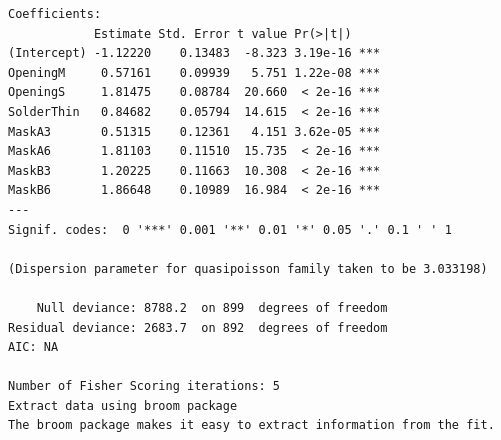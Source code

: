 \documentclass[
]{book}
\begin{document}
\begin{verbatim}
Coefficients:
            Estimate Std. Error t value Pr(>|t|)    
(Intercept) -1.12220    0.13483  -8.323 3.19e-16 ***
OpeningM     0.57161    0.09939   5.751 1.22e-08 ***
OpeningS     1.81475    0.08784  20.660  < 2e-16 ***
SolderThin   0.84682    0.05794  14.615  < 2e-16 ***
MaskA3       0.51315    0.12361   4.151 3.62e-05 ***
MaskA6       1.81103    0.11510  15.735  < 2e-16 ***
MaskB3       1.20225    0.11663  10.308  < 2e-16 ***
MaskB6       1.86648    0.10989  16.984  < 2e-16 ***
---
Signif. codes:  0 '***' 0.001 '**' 0.01 '*' 0.05 '.' 0.1 ' ' 1

(Dispersion parameter for quasipoisson family taken to be 3.033198)

    Null deviance: 8788.2  on 899  degrees of freedom
Residual deviance: 2683.7  on 892  degrees of freedom
AIC: NA

Number of Fisher Scoring iterations: 5
Extract data using broom package
The broom package makes it easy to extract information from the fit.


\end{verbatim}
\end{document}
